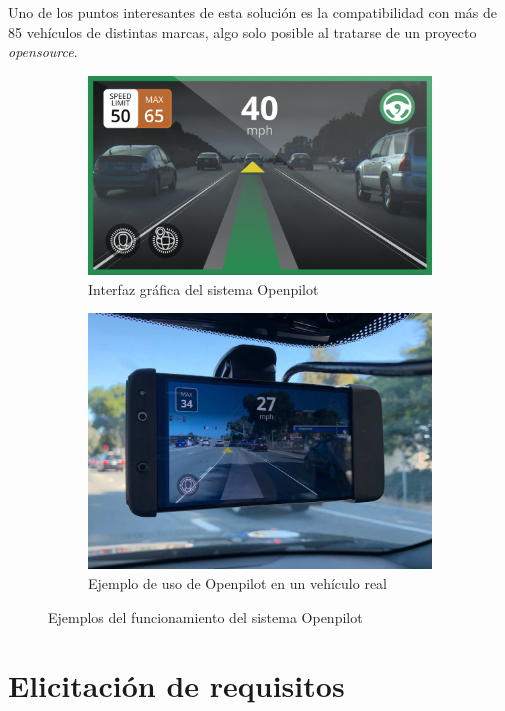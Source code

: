Uno de los puntos interesantes de esta solución es la compatibilidad con más de 85 vehículos de distintas marcas, algo solo posible al tratarse de un proyecto \textit{opensource}.

\begin{figure}[h!]
    \begin{subfigure}[c]{.5\textwidth}
      \centering
      \includegraphics[width=.8\linewidth]{img/Openpilot.jpg}
      \caption{Interfaz gráfica del sistema Openpilot}
      \label{fig:openpilot1}
    \end{subfigure}%
    \begin{subfigure}[c]{.5\textwidth}
      \centering
      \includegraphics[width=.8\linewidth]{img/openpilot2.jpeg}
      \caption{Ejemplo de uso de Openpilot en un vehículo real}
      \label{fig:openpilot2}
    \end{subfigure}
    
    \caption{Ejemplos del funcionamiento del sistema Openpilot}
    \label{fig:ejemploOpenpilot}
\end{figure}

\section{Elicitación de requisitos}\label{sec:requisitos}


